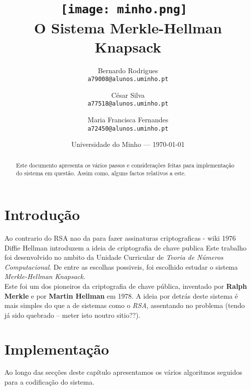 \documentclass[11pt]{report}
\begin{document}
\title{\texttt{[image: minho.png]}~\\[1cm] O Sistema Merkle-Hellman Knapsack}

\author{Bernardo Rodrigues\\ \texttt{a79008@alunos.uminho.pt}\\ \and César Silva\\ \texttt{a77518@alunos.uminho.pt}\\ \and Maria Francisca Fernandes\\ \texttt{a72450@alunos.uminho.pt}\\}

\date{Universidade do Minho --- \today}

\maketitle

\begin{abstract}

	Este documento apresenta os vários passos e considerações feitas para implementação do sistema em questão. Assim como, alguns factos relativos a este.  


\end{abstract}

\tableofcontents

\chapter{Introdução}

	Ao contrario do RSA nao da para fazer assinaturas criptograficas - wiki
1976 Diffie Hellman introduzem a ideia de criptografia de chave publica
Este trabalho foi desenvolvido no ambito da Unidade Curricular de \textit{Teoria de Números Computacional}. De entre as escolhas possiveis, foi escolhido estudar o sistema \textit{Merkle-Hellman Knapsack}. \\
Este foi um dos pioneiros da criptografia de chave pública, inventado por \textbf{Ralph Merkle} e por \textbf{Martin Hellman} em 1978.
A ideia por detrás deste sistema é mais simples do que a de sistemas como o \textit{RSA}, assentando no problema  (tendo já sido quebrado -- meter isto noutro sitio??).

\chapter{Implementação}

Ao longo das secções deste capítulo apresentamos os vários algoritmos seguidos para a codificação do sistema.
\end{document}
